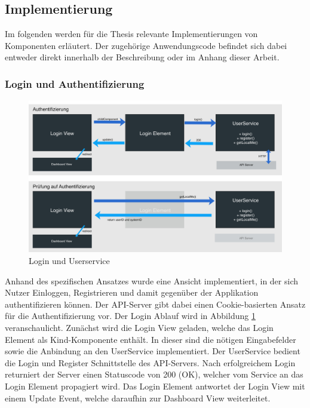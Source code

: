 \subsection{Implementierung}

Im folgenden werden für die Thesis relevante Implementierungen von Komponenten erläutert.
Der zugehörige Anwendungscode befindet sich dabei entweder direkt innerhalb der Beschreibung oder im Anhang dieser Arbeit.

\subsubsection{Login und Authentifizierung}
\label{Login-und-Authentifikation}

\begin{figure}[hptb]
 \centering
 \includegraphics[width=\linewidth]{kapitel4/login.jpg}
 \caption{Login und Userservice}
 \label{kapitel4/login}
\end{figure}
\vspace{0.3cm}

Anhand des spezifischen Ansatzes wurde eine Ansicht implementiert, in der sich Nutzer Einloggen, Registrieren und damit gegenüber der Applikation authentifizieren können.
Der \ac{API}-Server gibt dabei einen Cookie-basierten Ansatz für die Authentifizierung vor. Der Login Ablauf wird in Abbildung \ref{kapitel4/login} veranschaulicht.
Zunächst wird die Login View geladen, welche das Login Element als Kind-Komponente enthält.
In dieser sind die nötigen Eingabefelder sowie die Anbindung an den UserService implementiert.
Der UserService bedient die Login und Register Schnittstelle des \ac{API}-Servers.
Nach erfolgreichem Login returniert der Server einen Statuscode von 200 (OK), welcher vom Service an das Login Element propagiert wird.
Das Login Element antwortet der Login View mit einem Update Event, welche daraufhin zur Dashboard View weiterleitet.

